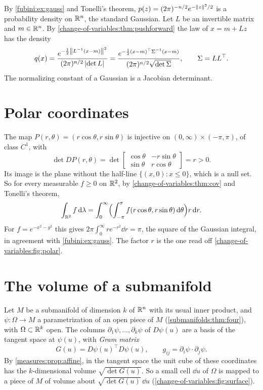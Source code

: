 \begin{notechapter}
\begin{example}\label{change-of-variables:ex:gauss}
By \cref{fubini:ex:gauss} and Tonelli's theorem,
$p(z) = (2\pi)^{-n/2}e^{-\left\|z\right\|^2/2}$ is a probability density on
$\mathbb{R}^n$, the standard Gaussian. Let $L$ be an invertible matrix and
$m\in\mathbb{R}^n$. By \cref{change-of-variables:thm:pushforward} the law of
$x = m + Lz$ has the density
\[
  q(x) = \frac{e^{-\frac12\left\|L^{-1}(x - m)\right\|^2}}
              {(2\pi)^{n/2}\left|\det L\right|}
  = \frac{e^{-\frac12(x - m)^\top\Sigma^{-1}(x - m)}}
         {(2\pi)^{n/2}\sqrt{\det\Sigma}} ,
  \qquad\Sigma = LL^\top .
\]
The normalizing constant of a Gaussian is a Jacobian determinant.
\end{example}

\section{Polar coordinates}\label{change-of-variables:sec:polar}

The map $P(r, \theta) = (r\cos\theta, r\sin\theta)$ is injective on
$(0, \infty)\times(-\pi, \pi)$, of class $C^1$, with
\[
  \det DP(r, \theta)
  = \det\begin{bmatrix}\cos\theta & -r\sin\theta\\
                       \sin\theta & r\cos\theta\end{bmatrix} = r > 0 .
\]
Its image is the plane without the half-line $\{(x, 0) : x\leq0\}$,
which is a null set. So for every measurable $f\geq0$ on $\mathbb{R}^2$, by
\cref{change-of-variables:thm:cov} and Tonelli's theorem,
\[
  \int_{\mathbb{R}^2}f\,\mathrm{d}\lambda
  = \int_0^\infty\Bigl(\int_{-\pi}^\pi
    f(r\cos\theta, r\sin\theta)\,\mathrm{d}\theta\Bigr)r\,\mathrm{d} r .
\]
For $f = e^{-x^2 - y^2}$ this gives
$2\pi\int_0^\infty re^{-r^2}\dd r = \pi$, the square of the Gaussian
integral, in agreement with \cref{fubini:ex:gauss}. The factor $r$ is
the one read off \cref{change-of-variables:fig:polar}.

\section{The volume of a submanifold}
\label{change-of-variables:sec:volume}

Let $M$ be a submanifold of dimension $k$ of $\mathbb{R}^n$ with its usual inner
product, and $\psi:\Omega\to M$ a parametrization of an open piece of
$M$ (\cref{submanifolds:thm:four}), with $\Omega\subset\mathbb{R}^k$ open. The
columns $\partial_1\psi,\dots,\partial_k\psi$ of $D\psi(u)$ are a basis
of the tangent space at $\psi(u)$, with \emph{Gram matrix}
\[
  G(u) = D\psi(u)^\top D\psi(u) , \qquad
  g_{ij} = \partial_i\psi\cdot\partial_j\psi .
\]
By \cref{measures:prop:affine}, in the tangent space the unit cube of
these coordinates has the $k$-dimensional volume $\sqrt{\det G(u)}$. So a
small cell $\dd u$ of $\Omega$ is mapped to a piece of $M$ of volume
about $\sqrt{\det G(u)}\,\dd u$
(\cref{change-of-variables:fig:surface}).


\end{notechapter}
